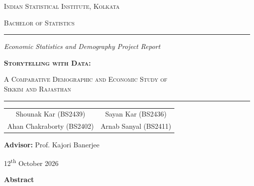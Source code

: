 \begin{titlepage}
    \centering
    \vspace*{0.2cm}


    \par
    \vspace{0.4cm}
    {\Large \textsc{Indian Statistical Institute, Kolkata}}\par
    \vspace{0.1cm}
    {\large \textsc{Bachelor of Statistics}}\par

    \vspace{0.5cm}
    \rule{\textwidth}{0.8pt}\par
    \vspace{0.4cm}


    {\large \itshape Economic Statistics and Demography \textbullet{} Project Report}\par
    \vspace{0.5cm}
    {\LARGE \bfseries \textsc{Storytelling with Data:}}\par
    \vspace{0.25cm}
    {\Large \textsc{A Comparative Demographic and Economic Study of\\ Sikkim and Rajasthan}}\par

    \vspace{0.4cm}
    \rule{\textwidth}{0.8pt}\par
    \vspace{0.6cm}
    {\large
    \begin{tabular}{c c}
        Shounak Kar (BS2439)    & Sayan Kar (BS2436) \\[0.2cm]
        Ahan Chakraborty (BS2402) & Arnab Sanyal (BS2411)
    \end{tabular}\par}

    \vspace{0.5cm}
    {\large \textbf{Advisor:} Prof. Kajori Banerjee}\par
    \vspace{0.2cm}
    {\large 12\textsuperscript{th} October 2026}\par

    \vspace{0.8cm}
    
    \begin{minipage}{0.88\textwidth}
        \centering
        {\large \textbf{Abstract}}\par
        \vspace{1cm}
        \justifying
        \small
        \noindent
        


\end{minipage}
\end{titlepage}
